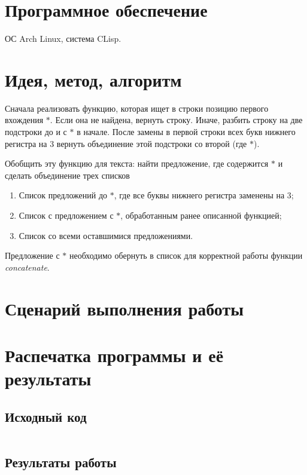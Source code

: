 \documentclass[12pt]{article}
\begin{document}
\section{Программное обеспечение}
ОС Arch Linux, система CLisp.

\section{Идея, метод, алгоритм}

Сначала реализовать функцию, которая ищет в строки позицию первого вхождения $*$. 
Если она не найдена, вернуть строку. Иначе, разбить строку на две подстроки 
до и с $*$ в начале. После замены в первой строки всех букв нижнего регистра
на 3 вернуть объединение этой подстроки со второй (где $*$).

Обобщить эту функцию для текста: найти предложение, где содержится $*$ и 
сделать объединение трех списков
\begin{enumerate}
    \item Список предложений до $*$, где все буквы нижнего регистра 
    заменены на 3;
    \item Список с предложением с $*$, обработанным ранее описанной функцией;
    \item Список со всеми оставшимися предложениями.
\end{enumerate}

Предложение с $*$ необходимо обернуть в список для корректной работы функции 
\textit{concatenate}.

\section{Сценарий выполнения работы}

\section{Распечатка программы и её результаты}

\subsection{Исходный код}
\inputminted[linenos, frame=lines]{lisp}{./editor.lisp}

\subsection{Результаты работы}
\inputminted[frame=lines]{lisp}{./log.lisp}
\end{document}
